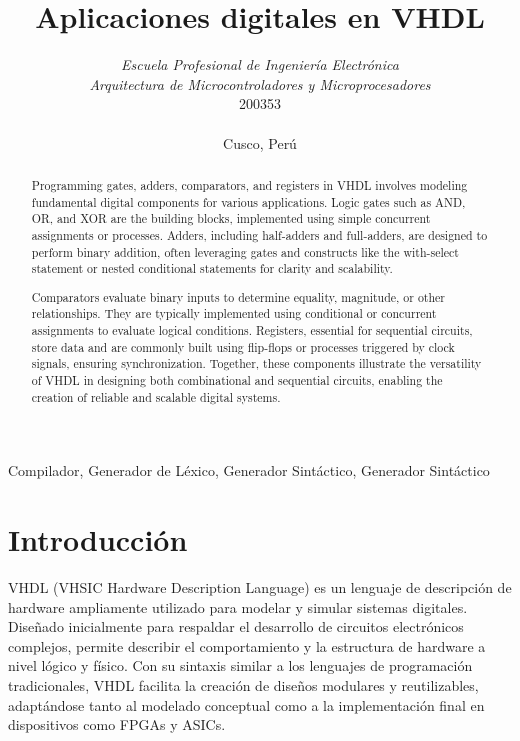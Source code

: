 \documentclass[conference]{IEEEtran}
\begin{document}
	
	\title{Aplicaciones digitales en VHDL}
	\author{	
		\textit{Escuela Profesional de Ingeniería Electrónica}\\
		\textit{Arquitectura de Microcontroladores y Microprocesadores}\\
		200353 \\\\
		Cusco, Perú
	}
	\maketitle
	
	\begin{abstract}
	Programming gates, adders, comparators, and registers in VHDL involves modeling fundamental digital components for various applications. Logic gates such as AND, OR, and XOR are the building blocks, implemented using simple concurrent assignments or processes. Adders, including half-adders and full-adders, are designed to perform binary addition, often leveraging gates and constructs like the with-select statement or nested conditional statements for clarity and scalability.
	
	Comparators evaluate binary inputs to determine equality, magnitude, or other relationships. They are typically implemented using conditional or concurrent assignments to evaluate logical conditions. Registers, essential for sequential circuits, store data and are commonly built using flip-flops or processes triggered by clock signals, ensuring synchronization. Together, these components illustrate the versatility of VHDL in designing both combinational and sequential circuits, enabling the creation of reliable and scalable digital systems.
	\end{abstract}
	
	\begin{IEEEkeywords}
		Compilador, Generador de Léxico, Generador Sintáctico, Generador Sintáctico
	\end{IEEEkeywords}
	
	\section{Introducción}
	VHDL (VHSIC Hardware Description Language) es un lenguaje de descripción de hardware ampliamente utilizado para modelar y simular sistemas digitales. Diseñado inicialmente para respaldar el desarrollo de circuitos electrónicos complejos, permite describir el comportamiento y la estructura de hardware a nivel lógico y físico. Con su sintaxis similar a los lenguajes de programación tradicionales, VHDL facilita la creación de diseños modulares y reutilizables, adaptándose tanto al modelado conceptual como a la implementación final en dispositivos como FPGAs y ASICs.
	
\end{document}

